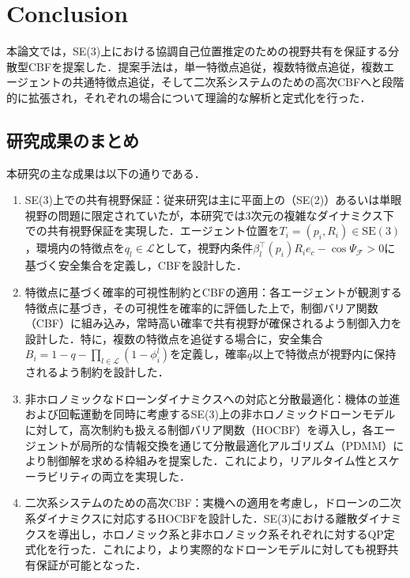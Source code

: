 \section{Conclusion}

本論文では，SE(3)上における協調自己位置推定のための視野共有を保証する分散型CBFを提案した．提案手法は，単一特徴点追従，複数特徴点追従，複数エージェントの共通特徴点追従，そして二次系システムのための高次CBFへと段階的に拡張され，それぞれの場合について理論的な解析と定式化を行った．

\subsection{研究成果のまとめ}

本研究の主な成果は以下の通りである．

\begin{enumerate}
    \item SE(3)上での共有視野保証：従来研究は主に平面上の（SE(2)）あるいは単眼視野の問題に限定されていたが，本研究では3次元の複雑なダイナミクス下での共有視野保証を実現した．エージェント位置を$T_i=(p_i, R_i)\in \mathrm{SE}(3)$，環境内の特徴点を$q_l\in \mathcal{L}$として，視野内条件$\beta_l^{\top}(p_i)R_ie_c-\cos\Psi_\mathcal{F}>0$に基づく安全集合を定義し，CBFを設計した．
    
    \item 特徴点に基づく確率的可視性制約とCBFの適用：各エージェントが観測する特徴点に基づき，その可視性を確率的に評価した上で，制御バリア関数（CBF）に組み込み，常時高い確率で共有視野が確保されるよう制御入力を設計した．特に，複数の特徴点を追従する場合に，安全集合$B_{i}=1-q-\prod_{l\in\mathcal{L}}(1-\phi_{i}^l)$を定義し，確率$q$以上で特徴点が視野内に保持されるよう制約を設計した．
    
    \item 非ホロノミックなドローンダイナミクスへの対応と分散最適化：機体の並進および回転運動を同時に考慮するSE(3)上の非ホロノミックドローンモデルに対して，高次制約も扱える制御バリア関数（HOCBF）を導入し，各エージェントが局所的な情報交換を通じて分散最適化アルゴリズム（PDMM）により制御解を求める枠組みを提案した．これにより，リアルタイム性とスケーラビリティの両立を実現した．
    
    \item 二次系システムのための高次CBF：実機への適用を考慮し，ドローンの二次系ダイナミクスに対応するHOCBFを設計した．SE(3)における離散ダイナミクスを導出し，ホロノミック系と非ホロノミック系それぞれに対するQP定式化を行った．これにより，より実際的なドローンモデルに対しても視野共有保証が可能となった．
\end{enumerate}

